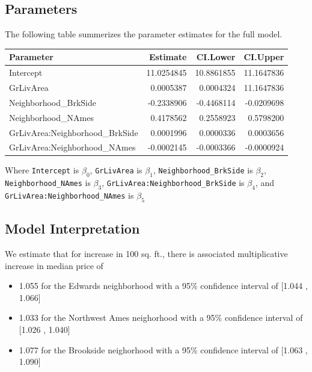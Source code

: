\documentclass[american,]{article}
\providecommand{\tightlist}{%
  \setlength{\itemsep}{0pt}\setlength{\parskip}{0pt}}
\begin{document}
\hypertarget{parameters}{%
\subsection{Parameters}\label{parameters}}

The following table summerizes the parameter estimates for the full
model.

\begin{table}[H]
\centering
\begin{tabular}{lrrr}
\toprule
Parameter & Estimate & CI.Lower & CI.Upper\\
\midrule
Intercept & 11.0254845 & 10.8861855 & 11.1647836\\
GrLivArea & 0.0005387 & 0.0004324 & 11.1647836\\
Neighborhood\_BrkSide & -0.2338906 & -0.4468114 & -0.0209698\\
Neighborhood\_NAmes & 0.4178562 & 0.2558923 & 0.5798200\\
GrLivArea:Neighborhood\_BrkSide & 0.0001996 & 0.0000336 & 0.0003656\\
GrLivArea:Neighborhood\_NAmes & -0.0002145 & -0.0003366 & -0.0000924\\
\bottomrule
\end{tabular}
\end{table}

Where \texttt{Intercept} is \(\beta_0\), \texttt{GrLivArea} is
\(\beta_1\), \texttt{Neighborhood\_BrkSide} is \(\beta_2\),
\texttt{Neighborhood\_NAmes} is \(\beta_3\),
\texttt{GrLivArea:Neighborhood\_BrkSide} is \(\beta_4\), and
\texttt{GrLivArea:Neighborhood\_NAmes} is \(\beta_5\)

\hypertarget{model-interpretation}{%
\subsection{Model Interpretation}\label{model-interpretation}}

We estimate that for increase in 100 sq. ft., there is associated
multiplicative increase in median price of

\begin{itemize}
\tightlist
\item
  1.055 for the Edwards neighborhood with a 95\% confidence interval of
  {[}1.044 , 1.066{]}
\item
  1.033 for the Northwest Ames neighorhood with a 95\% confidence
  interval of {[}1.026 , 1.040{]}
\item
  1.077 for the Brookside neighorhood with a 95\% confidence interval of
  {[}1.063 , 1.090{]}
\end{itemize}
\end{document}
